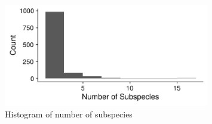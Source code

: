 \begin{knitrout}
\begin{kframe}
\begin{alltt}
 \hlstd{(}  \hlopt{+}
  \hlstd{()} \hlopt{+}
  \hlstd{(}\hlstd{)} \hlopt{+}
  \hlstd{(}\hlstd{)}
\end{alltt}
\end{kframe}\begin{figure}[t]

{\centering \includegraphics[width=0.8\textwidth]{figure/wilsonReaderTaxonomyRead-1} 

}

\caption[Histogram of number of subspecies]{Histogram of number of subspecies}\label{fig:wilsonReaderTaxonomyRead}
\end{figure}

\begin{kframe}\begin{alltt}
\hlopt{$} \hlkwb{<-} \hlopt{$}\hlopt{$}
\end{alltt}
\end{kframe}
\end{knitrout}

